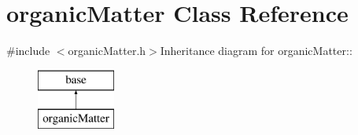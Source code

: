 \hypertarget{classorganic_matter}{
\section{organicMatter Class Reference}
\label{classorganic_matter}
}


{\ttfamily \#include $<$organicMatter.h$>$}Inheritance diagram for organicMatter::\begin{figure}[H]
\begin{center}
\leavevmode
\includegraphics[height=2cm]{classorganic_matter}
\end{center}
\end{figure}
